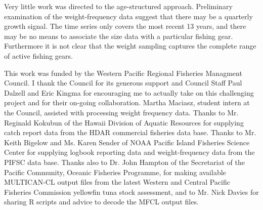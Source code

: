 \documentclass[12pt,letterpaper]{article}
\begin{document}
Very little work was directed to the age-structured approach.
Preliminary examination of the weight-frequency data suggest that
there may be a quarterly growth signal. The time series only covers
the most recent 13 years, and there may be no means to associate the
size data with a particular fishing gear. Furthermore it is not clear
that the weight sampling captures the complete range of active fishing
gears.

\clearpage
This work was funded by the Western Pacific Regional Fisheries
Managment Council. I thank the Council for its generous support and
Council Staff Paul Dalzell and Eric Kingma for encouraging me to
actually take on this challenging project and for their on-going
collaboration.
Martha Maciasz, student intern at the Council, assisted with
processing weight frequency data.
Thanks to Mr. Reginald Kokubun of the Hawaii Division of Aquatic
Resources for supplying catch report data from the HDAR commercial
fisheries data base.
Thanks to Mr. Keith Bigelow and Ms. Karen Sender of NOAA Pacific
Island Fisheries Science Center for supplying logbook reporting data and
weight-frequency data from the PIFSC data base.
Thanks also to Dr. John Hampton of the Secretariat of the Pacific
Community, Oceanic Fisheries Programme, for making available
MULTICAN-CL output files from the latest Western and Central Pacific
Fisheries Commission yellowfin tuna stock assessment, and to Mr. Nick
Davies for sharing R scripts and advice to decode the MFCL output files.
\end{document}
